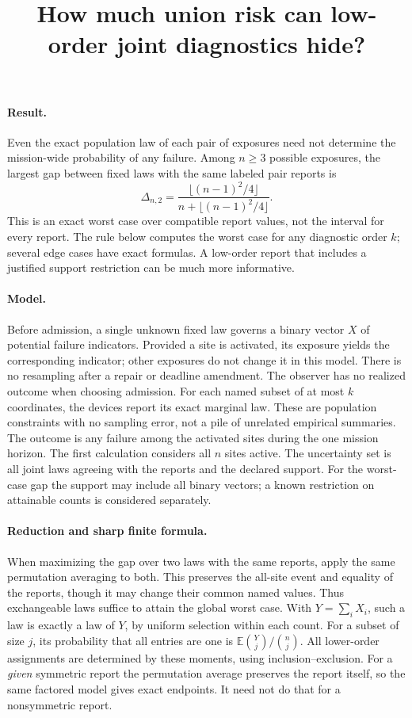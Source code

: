 \documentclass{article}
\title{How much union risk can low-order joint diagnostics hide?}
\begin{document}
\maketitle

\paragraph{Result.}
Even the exact population law of each pair of exposures need not
determine the mission-wide probability of any failure. Among
\(n\ge 3\) possible exposures, the largest gap between fixed laws
with the same labeled pair reports is
\[
  \Delta_{n,2}=
  \frac{\lfloor (n-1)^2/4\rfloor}{n+\lfloor (n-1)^2/4\rfloor}.
\]
This is an exact worst case over compatible report values, not the
interval for every report. The rule below computes the worst case
for any diagnostic order \(k\); several edge cases have exact formulas.
A low-order report that includes a justified support restriction can
be much more informative.

\paragraph{Model.}
Before admission, a single unknown fixed law governs a binary
vector \(X\) of potential failure indicators. Provided a site is
activated, its exposure yields the corresponding indicator;
other exposures do not change it in this model. There is no
resampling after a repair or deadline amendment. The observer
has no realized outcome when choosing admission. For each named
subset of at most \(k\) coordinates, the devices report its
exact marginal law. These are population constraints with no
sampling error, not a pile of unrelated empirical summaries.
The outcome is any failure among the activated sites during the
one mission horizon. The first calculation considers all \(n\)
sites active. The uncertainty set is all joint laws agreeing with
the reports and the declared support. For the worst-case gap
the support may include all binary vectors; a known restriction
on attainable counts is considered separately.

\paragraph{Reduction and sharp finite formula.}
When maximizing the gap over two laws with the same reports, apply
the same permutation averaging to both. This preserves the all-site
event and equality of the reports, though it may change their common
named values. Thus exchangeable laws suffice to attain the global
worst case. With \(Y=\sum_i X_i\), such a law is exactly a law
of \(Y\), by uniform selection within each count. For a subset of
size \(j\), its probability that all entries are one is
\(\mathbb{E}\binom Yj/\binom nj\). All lower-order assignments
are determined by these moments, using inclusion--exclusion.
For a \emph{given} symmetric report the permutation average
preserves the report itself, so the same factored model gives
exact endpoints. It need not do that for a nonsymmetric report.
\end{document}
